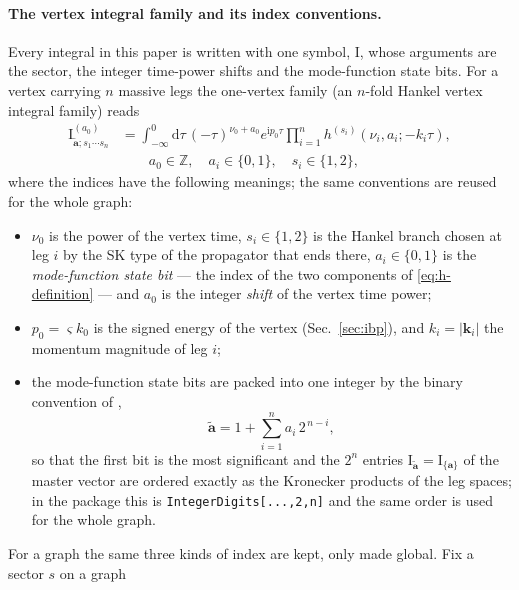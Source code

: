 \documentclass[11pt,a4paper]{article}
\newcommand{\dd}{\mathrm d}
\newcommand{\ii}{\mathrm i}
\begin{document}
\paragraph{The vertex integral family and its index conventions.}
Every integral in this paper is written with one symbol, $\text{I}$, whose arguments are the sector,
the integer time-power shifts and the mode-function state bits. For a vertex carrying $n$ massive legs the
one-vertex family (an $n$-fold Hankel vertex integral family) reads
\begin{equation}
  \begin{aligned}
  \text{I}^{(a_0)}_{\tilde{\bm a};s_1\cdots s_n}
  &=\int_{-\infty}^0\dd\tau\,(-\tau)^{\nu_0+a_0}e^{\ii p_0\tau}
    \prod_{i=1}^{n}h^{(s_i)}(\nu_i,a_i;-k_i\tau),\\
  &\hspace{2em} a_0\in\mathbb Z,\quad a_i\in\{0,1\},\quad s_i\in\{1,2\},
  \end{aligned}
  \label{eq:vertex-integral-family}
\end{equation}
where the indices have the following meanings; the same conventions are reused for the whole graph:
\begin{itemize}
  \item $\nu_0$ is the power of the vertex time, $s_i\in\{1,2\}$ is the Hankel branch chosen at
        leg $i$ by the SK type of the propagator that ends there, $a_i\in\{0,1\}$ is the \emph{mode-function state bit}
        --- the index of the two components of \eqref{eq:h-definition} --- and $a_0$ is the integer
        \emph{shift} of the vertex time power;
  \item $p_0=\varsigma k_0$ is the signed energy of the vertex (Sec.~\ref{sec:ibp}), and
        $k_i=|\bm k_i|$ the momentum magnitude of leg $i$;
  \item the mode-function state bits are packed into one integer by the binary convention of \cite{Chen:2023iix},
  \begin{equation}
    \tilde{\bm a}=1+\sum_{i=1}^{n}a_i\,2^{\,n-i},
    \label{eq:binary-label}
  \end{equation}
  so that the first bit is the most significant and the $2^n$ entries
  $\text{I}_{\tilde{\bm a}}=\text{I}_{\{\bm a\}}$ of the master vector are ordered exactly as the
  Kronecker products of the leg spaces; in the package this is
  \texttt{IntegerDigits[...,2,n]} and the same order is used for the whole graph.
\end{itemize}
For a graph the same three kinds of index are kept, only made global. Fix a sector $s$ on a graph
\end{document}

